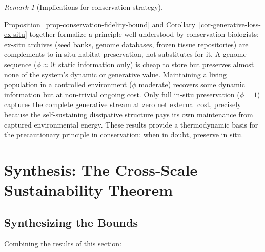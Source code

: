 \documentclass[11pt]{article}
\theoremstyle{plain}
\theoremstyle{definition}
\theoremstyle{remark}
\newtheorem{remark}{Remark}
\newcounter{none}
\let\origsection\section
\renewcommand{\section}{\needspace{12\baselineskip}\origsection}
\let\origsubsection\subsection
\renewcommand{\subsection}{\needspace{7\baselineskip}\origsubsection}
\begin{document}
\begin{remark}[Implications for conservation strategy]
\label{rem-conservation-strategy}

Proposition~\ref{prop-conservation-fidelity-bound} and Corollary~\ref{cor-generative-loss-ex-situ} together formalize a principle well understood by conservation biologists: ex-situ archives (seed banks, genome databases, frozen tissue repositories) are complements to in-situ habitat preservation, not substitutes for it. A genome sequence ($\phi \approx 0$: static information only) is cheap to store but preserves almost none of the system's dynamic or generative value. Maintaining a living population in a controlled environment ($\phi$ moderate) recovers some dynamic information but at non-trivial ongoing cost. Only full in-situ preservation ($\phi = 1$) captures the complete generative stream at zero net external cost, precisely because the self-sustaining dissipative structure pays its own maintenance from captured environmental energy. These results provide a thermodynamic basis for the precautionary principle in conservation: when in doubt, preserve in situ.
\end{remark}

\section{Synthesis: The Cross-Scale Sustainability
Theorem}\label{synthesis-the-cross-scale-sustainability-theorem}

\subsection{Synthesizing the Bounds}\label{synthesizing-the-bounds}

Combining the results of this section:
\end{document}
